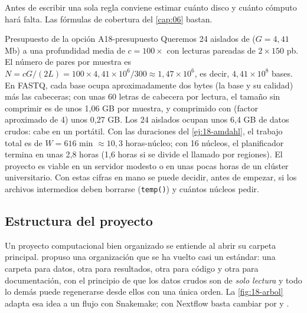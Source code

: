 Antes de escribir una sola regla conviene estimar cuánto disco y cuánto cómputo hará falta. Las fórmulas de cobertura del \cref{cap:06} bastan.

\begin{ejemplo}{Presupuesto de la opción A}{18-presupuesto}
Queremos 24 aislados de  ($G=4{,}41$ Mb) a una profundidad media de $c=100\times$ con lecturas pareadas de $2\times150$ pb. El número de pares por muestra es $N=cG/(2L)=100\times4{,}41\times10^6/300\approx1{,}47\times10^6$, es decir, $4{,}41\times10^8$ bases. En FASTQ, cada base ocupa aproximadamente dos bytes (la base y su calidad) más las cabeceras; con unas 60 letras de cabecera por lectura, el tamaño sin comprimir es de unos 1,06 GB por muestra, y comprimido con  (factor aproximado de 4) unos 0,27 GB. Los 24 aislados ocupan unos 6,4 GB de datos crudos: cabe en un portátil. Con las duraciones del \cref{ej:18-amdahl}, el trabajo total es de $W=616$ min $\approx10{,}3$ horas-núcleo; con 16 núcleos, el planificador termina en unas 2,8 horas (1,6 horas si se divide el llamado por regiones). El proyecto es viable en un servidor modesto o en unas pocas horas de un clúster universitario. Con estas cifras en mano se puede decidir, antes de empezar, si los archivos intermedios deben borrarse (\texttt{temp()}) y cuántos núcleos pedir.
\end{ejemplo}

\subsection{Estructura del proyecto}

Un proyecto computacional bien organizado se entiende al abrir su carpeta principal. \textcite{c18-noble2009} propuso una organización que se ha vuelto casi un estándar: una carpeta para datos, otra para resultados, otra para código y otra para documentación, con el principio de que los datos crudos son de \emph{solo lectura} y todo lo demás puede regenerarse desde ellos con una única orden. La \cref{fig:18-arbol} adapta esa idea a un flujo con Snakemake; con Nextflow basta cambiar  por  y .

